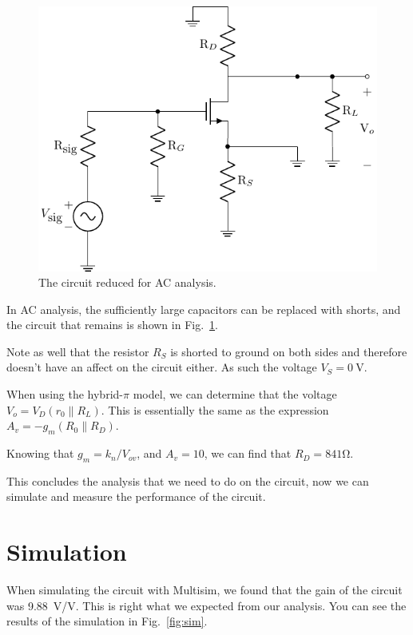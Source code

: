 \documentclass{../../ece-report}
\begin{document}
\begin{figure}[h!]
  \centering
  \includegraphics{../circuits/circuit_ac.pdf}
  \caption{The circuit reduced for AC analysis.}\label{fig:circuit_ac}
\end{figure}

In AC analysis, the sufficiently large capacitors can be replaced
with shorts, and the circuit that remains is shown in Fig.~\ref{fig:circuit_ac}.

Note as well that the resistor $R_S$ is shorted to ground on both sides
and therefore doesn't have an affect on the circuit either. As such
the voltage $V_S = 0~$V.

When using the hybrid-$\pi$ model, we can determine that the voltage $V_o = V_D (r_0 \| R_L)$.
This is essentially the same as the expression $A_v = -g_m (R_0 \| R_D)$. 

Knowing that $g_m = k_n / V_{ov}$, and $A_v = 10$, we can find that $R_D = 841 \si{\ohm}$.

This concludes the analysis that we need to do on the circuit, now we can simulate
and measure the performance of the circuit.

\section{Simulation}

When simulating the circuit with Multisim, we found that the gain of the circuit
was 9.88~\si{\V/\V}. This is right what we expected from our analysis.
You can see the results of the simulation in Fig.~\ref{fig:sim}.
\end{document}
